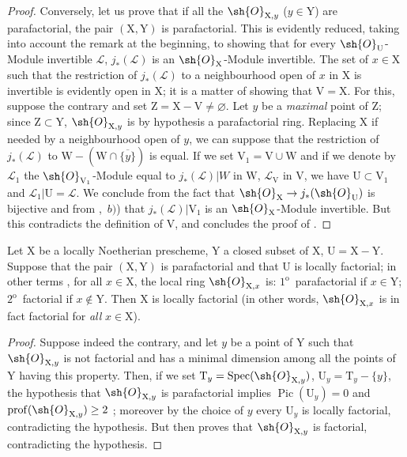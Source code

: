 \begin{proof}
Conversely, let us prove that if all the $\sh{O}_{\mathrm{X},y}$ ($y\in\mathrm{Y}$) are parafactorial, the pair $(\mathrm{X},\mathrm{Y})$ is parafactorial.
This is evidently reduced, taking into account the remark at the beginning, to showing that for every $\sh{O}_{\mathrm{U}}$-Module invertible $\mathscr{L}$, $j_*(\mathscr{L})$ is an $\sh{O}_{\mathrm{X}}$-Module invertible.
The set of $x\in\mathrm{X}$ such that the restriction of $j_*(\mathscr{L})$ to a neighbourhood open of $x$ in $\mathrm{X}$ is invertible is evidently open in $\mathrm{X}$; it is a matter of showing that $\mathrm{V}=\mathrm{X}$.
For this, suppose the contrary and set $\mathrm{Z}=\mathrm{X}-\mathrm{V}\neq\varnothing$.
Let $y$ be a \emph{maximal} point of $\mathrm{Z}$; since $\mathrm{Z}\subset\mathrm{Y}$, $\sh{O}_{\mathrm{X},y}$ is by hypothesis a parafactorial ring.
Replacing $\mathrm{X}$ if needed by a neighbourhood open of $y$, we can suppose that the restriction of $j_*(\mathscr{L})$ to $\mathrm{W}-(\mathrm{W}\cap\overline{\{y\}})$ is equal.
If we set $\mathrm{V}_1=\mathrm{V}\cup\mathrm{W}$ and if we denote by $\mathscr{L}_1$ the $\sh{O}_{\mathrm{V}_1}$-Module equal to $j_*(\mathscr{L})|W$ in $\mathrm{W}$, $\mathscr{L}_{\mathrm{V}}$ in $\mathrm{V}$, we have $\mathrm{U}\subset\mathrm{V}_1$ and $\mathscr{L}_1|\mathrm{U}=\mathscr{L}$.
We conclude from the fact that $\sh{O}_{\mathrm{X}}\to j_*(\sh{O}_{\mathrm{U}})$ is bijective and from ,~$b)$) that $j_*(\mathscr{L})|\mathrm{V}_1$ is an $\sh{O}_{\mathrm{X}}$-Module invertible.
But this contradicts the definition of $\mathrm{V}$, and concludes the proof of .
\end{proof}

\begin{corollary}[21.13.11]
\label{IV.21.13.11}
Let $\mathrm{X}$ be a locally Noetherian prescheme, $\mathrm{Y}$ a closed subset of $\mathrm{X}$, $\mathrm{U}=\mathrm{X}-\mathrm{Y}$.
Suppose that the pair $(\mathrm{X},\mathrm{Y})$ is parafactorial and that $\mathrm{U}$ is locally factorial; in other terms , for all $x\in\mathrm{X}$, the local ring $\sh{O}_{\mathrm{X},x}$ is:
$1^{\mathrm{o}}$~parafactorial if $x\in\mathrm{Y}$;
$2^{\mathrm{o}}$~factorial if $x\notin\mathrm{Y}$.
Then $\mathrm{X}$ is locally factorial (in other words, $\sh{O}_{\mathrm{X},x}$ is in fact factorial for \emph{all} $x\in\mathrm{X}$).
\end{corollary}

\begin{proof}
Suppose indeed the contrary, and let $y$ be a point of $\mathrm{Y}$ such that $\sh{O}_{\mathrm{X},y}$ is not factorial and has a minimal dimension among all the points of $\mathrm{Y}$ having this property.
Then, if we set $\mathrm{T}_y=\operatorname{Spec}(\sh{O}_{\mathrm{X},y})$, $\mathrm{U}_y=\mathrm{T}_y-\{y\}$, the hypothesis that $\sh{O}_{\mathrm{X},y}$ is parafactorial implies $\operatorname{Pic}(\mathrm{U}_y)=0$ and $\operatorname{prof}(\sh{O}_{\mathrm{X},y})\geq 2$ ; moreover by the choice of $y$ every $\mathrm{U}_y$ is locally factorial, contradicting the hypothesis.
But then  proves that $\sh{O}_{\mathrm{X},y}$ is factorial, contradicting the hypothesis.
\end{proof}

